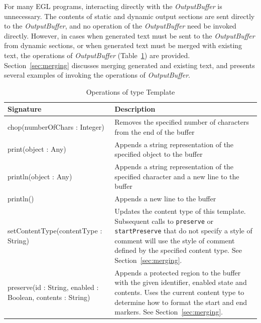 For many EGL programs, interacting directly with the \emph{OutputBuffer} is 
unnecessary. The contents of static and dynamic output sections are sent 
directly to the \emph{OutputBuffer}, and no operation of the \emph{OutputBuffer}
need be invoked directly. However, in cases when generated text must be sent
to the \emph{OutputBuffer} from dynamic sections, or when generated text must
be merged with existing text, the operations of \emph{OutputBuffer} (Table~\ref{tab:OutputBufferOperations}) are provided. Section~\ref{sec:merging}
discusses merging generated and existing text, and presents several examples
of invoking the operations of \emph{OutputBuffer}.

\begin{longtable} {|p{5.5cm}|p{6.5cm}|}
			
			\caption{Operations of type Template}
			\label{tab:OutputBufferOperations}\\
			
			\hline
							
			\textbf{Signature} & \textbf{Description} \\\hline
			
			chop(numberOfChars : Integer) & Removes the specified number of characters from the end of the buffer \\\hline
			
			print(object : Any) & Appends a string representation of the specified object to the buffer \\\hline
			
			println(object : Any) & Appends a string representation of the specified character and a new line to the buffer \\\hline
			
			println() & Appends a new line to the buffer \\\hline
			
			setContentType(contentType : String) & Updates the content type of this template. Subsequent calls to \texttt{pr\-es\-er\-ve} or \texttt{st\-a\-rtPr\-es\-er\-ve} that do not specify a style of comment will use the style of comment defined by the specified content type. See Section~\ref{sec:merging}. \\\hline
			
			preserve(id : String, enabled : Boolean, contents : String) & Appends a protected region to the buffer with the given identifier, enabled state and contents. Uses the current content type to determine how to format the start and end markers. See Section~\ref{sec:merging}. \\\hline
			

\end{longtable}
